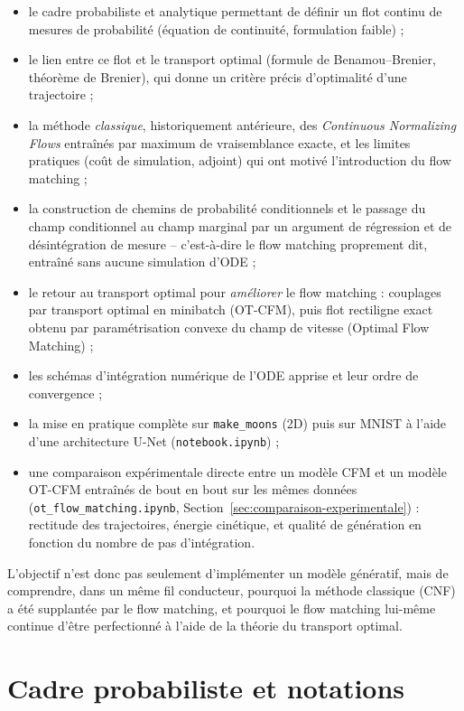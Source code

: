 \documentclass[11pt,a4paper]{article}
\theoremstyle{definition}
\theoremstyle{plain}
\theoremstyle{remark}
\begin{document}
\begin{itemize}[leftmargin=*]
  \item le cadre probabiliste et analytique permettant de définir un flot
  continu de mesures de probabilité (équation de continuité, formulation faible) ;
  \item le lien entre ce flot et le transport optimal (formule de
  Benamou--Brenier, théorème de Brenier), qui donne un critère précis
  d'\og optimalité \fg{} d'une trajectoire ;
  \item la méthode \emph{classique}, historiquement antérieure, des
  \emph{Continuous Normalizing Flows} entraînés par maximum de vraisemblance
  exacte, et les limites pratiques (coût de simulation, adjoint) qui ont motivé
  l'introduction du flow matching ;
  \item la construction de chemins de probabilité conditionnels et le passage
  du champ conditionnel au champ marginal par un argument de régression et de
  désintégration de mesure -- c'est-à-dire le flow matching proprement dit,
  entraîné sans aucune simulation d'ODE ;
  \item le retour au transport optimal pour \emph{améliorer} le flow matching :
  couplages par transport optimal en minibatch (OT-CFM), puis flot rectiligne
  exact obtenu par paramétrisation convexe du champ de vitesse (Optimal Flow
  Matching) ;
  \item les schémas d'intégration numérique de l'ODE apprise et leur ordre de
  convergence ;
  \item la mise en pratique complète sur \texttt{make\_moons} (2D) puis sur
  MNIST à l'aide d'une architecture U-Net (\texttt{notebook.ipynb}) ;
  \item une comparaison expérimentale directe entre un modèle CFM et un modèle
  OT-CFM entraînés de bout en bout sur les mêmes données
  (\texttt{ot\_flow\_matching.ipynb}, Section~\ref{sec:comparaison-experimentale}) : rectitude des
  trajectoires, énergie cinétique, et qualité de génération en fonction du nombre de pas
  d'intégration.
\end{itemize}

L'objectif n'est donc pas seulement d'implémenter un modèle génératif, mais de
comprendre, dans un même fil conducteur, pourquoi la méthode classique (CNF) a
été supplantée par le flow matching, et pourquoi le flow matching lui-même
continue d'être perfectionné à l'aide de la théorie du transport optimal.

\section{Cadre probabiliste et notations}
\end{document}
